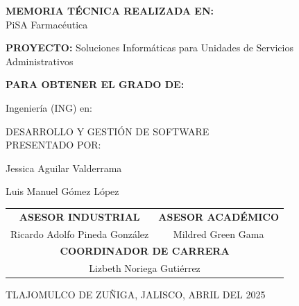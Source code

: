 \documentclass[12pt,letterpaper,spanish, xcolor=table]{report}
\begin{document}
\begin{center}
	
\large{\textbf{MEMORIA TÉCNICA REALIZADA EN:}}
 \\ PiSA Farmacéutica

\centerline{\hbox{}}

\large{\textbf{PROYECTO:} Soluciones Informáticas para Unidades de Servicios Administrativos}

\vspace{0.1in}
\large{\textbf{PARA OBTENER EL GRADO DE:}}

\large{Ingeniería (ING) en:}
\vspace{0.05in}

\large{DESARROLLO Y GESTIÓN DE SOFTWARE}
\\
\large{PRESENTADO POR:}

Jessica Aguilar Valderrama %

Luis Manuel Gómez López %

\vspace{0.2in}

\begin{tabular}{cc}
	\vspace{0.2in}
	\textbf{ASESOR INDUSTRIAL} & \textbf{ASESOR ACADÉMICO} \\
	
	Ricardo Adolfo Pineda González & Mildred Green Gama\\
	\multicolumn{2}{c}{\textbf{COORDINADOR DE CARRERA}
	\vspace{0.2in}
	} \\
	
	\multicolumn{2}{c}{
			Lizbeth Noriega Gutiérrez }
	\end{tabular}
	
\end{center}
\begin{flushright}\small{ TLAJOMULCO DE ZUÑIGA, JALISCO, ABRIL DEL 2025} \end{flushright}

\newpage




\end{document}
